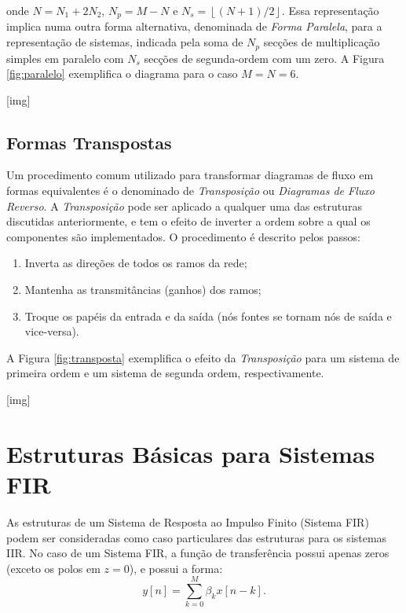 \documentclass[11pt]{article}
\begin{document}
\noindent onde $N = N_1 + 2N_2$, $N_p = M - N$ e $N_s = \left\lfloor (N+1) / 2 \right\rfloor$. Essa representação implica numa outra forma alternativa, denominada de \textit{Forma Paralela}, para a representação de sistemas, indicada pela soma de $N_p$ secções de multiplicação simples em paralelo com $N_s$ secções de segunda-ordem com um zero. A Figura \ref{fig:paralelo} exemplifica o diagrama para o caso $M = N = 6$.

[img]

\subsection{Formas Transpostas}

Um procedimento comum utilizado para transformar diagramas de fluxo em formas equivalentes é o denominado de \textit{Transposição} ou \textit{Diagramas de Fluxo Reverso}. A \textit{Transposição} pode ser aplicado a qualquer uma das estruturas discutidas anteriormente, e tem o efeito de inverter a ordem sobre a qual os componentes são implementados. O procedimento é descrito pelos passos:

\begin{enumerate}
	\item Inverta as direções de todos os ramos da rede;
	
	\item Mantenha as transmitâncias (ganhos) dos ramos;
	
	\item Troque os papéis da entrada e da saída (nós fontes se tornam nós de saída e vice-versa).
\end{enumerate}

A Figura \ref{fig:transposta} exemplifica o efeito da \textit{Transposição} para um sistema de primeira ordem e um sistema de segunda ordem, respectivamente.

[img]

\section{Estruturas Básicas para Sistemas FIR}

As estruturas de um Sistema de Resposta ao Impulso Finito (Sistema FIR) podem ser consideradas como caso particulares das estruturas para os sistemas IIR. No caso de um Sistema FIR, a função de transferência possui apenas zeros (exceto os polos em $z = 0$), e possui a forma:
\begin{equation}
	y[n] = \sum_{k=0}^M \beta_k x[n-k].
\end{equation} 
\end{document}
